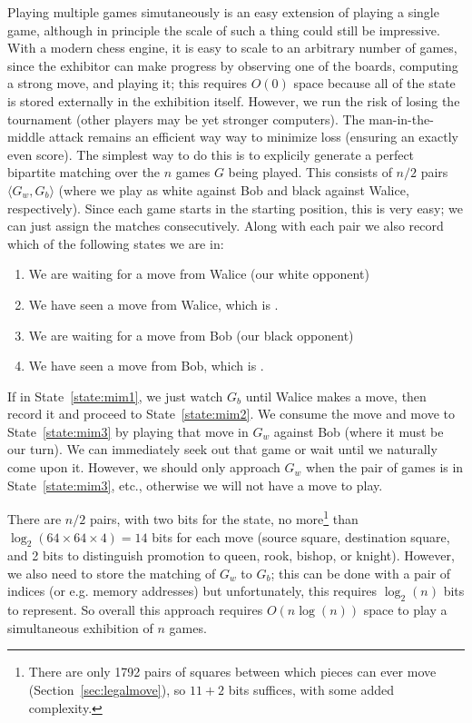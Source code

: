 \documentclass[twocolumn]{amsart}
\begin{document}
Playing multiple games simutaneously is an easy extension of playing a
single game, although in principle the scale of such a thing could
still be impressive. With a modern chess engine, it is easy to scale
to an arbitrary number of games, since the exhibitor can make progress
by observing one of the boards, computing a strong move, and playing
it; this requires $O(0)$ space because all of the state is stored
externally in the exhibition itself. 
However, we run the risk of losing the tournament (other players may
be yet stronger computers). The man-in-the-middle attack remains an
efficient way way to minimize loss (ensuring an exactly even score).
The simplest way to do this is to explicily generate a perfect
bipartite matching over the $n$ games $G$ being played. This consists
of $n/2$ pairs $\langle G_w, G_b \rangle$ (where we play as white
against Bob and black against Walice, respectively). Since each game
starts in the starting position, this is very easy; we can just assign
the matches consecutively. Along with each pair we also record which
of the following states we are in:
\begin{enumerate}
\item We are waiting for a move from Walice (our white opponent) \label{state:mim1}
\item We have seen a move from Walice, which is \underline{\hspace{6em}}. \label{state:mim2}
\item We are waiting for a move from Bob (our black opponent) \label{state:mim3}
\item We have seen a move from Bob, which is \underline{\hspace{6em}}. \label{state:mim4}
\end{enumerate}
If in State~\ref{state:mim1}, we just watch $G_b$ until Walice makes a
move, then record it and proceed to State~\ref{state:mim2}. We consume
the move and move to State~\ref{state:mim3} by playing that move in
$G_w$ against Bob (where it must be our turn). We can immediately seek
out that game or wait until we naturally come upon it. However, we
should only approach $G_w$ when the pair of games is in
State~\ref{state:mim3}, etc., otherwise we will not have a move to play.

There are $n/2$ pairs, with two bits for the state, no more\footnote{
  There are only 1792 pairs of squares between which pieces can ever
  move (Section~\ref{sec:legalmove}), so $11+2$ bits suffices, with
  some added complexity.} than $\log_2(64 \times 64 \times 4) = 14$ bits for
each move (source square, destination square, and 2 bits to
distinguish promotion to queen, rook, bishop, or knight). However, we
also need to store the matching of $G_w$ to $G_b$; this can be done
with a pair of indices (or e.g. memory addresses) but unfortunately,
this requires $\log_2(n)$ bits to represent. So overall this approach
requires $O(n \log(n))$ space to play a simultaneous exhibition of $n$
games.
\end{document}
